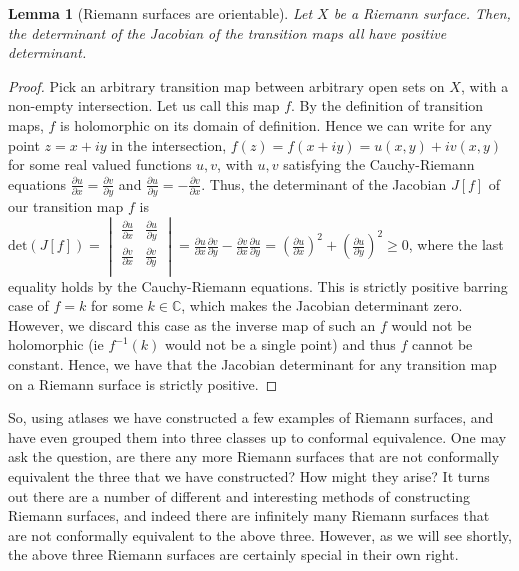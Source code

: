 \documentclass[11pt]{report}
\newtheorem{lemma}[thm]{Lemma}
\theoremstyle{definition}
\begin{document}
\begin{lemma}[Riemann surfaces are orientable]
  Let $X$ be a Riemann surface. Then, the determinant of the Jacobian of the transition maps all have positive determinant.
\end{lemma}
\begin{proof}
  Pick an arbitrary transition map between arbitrary open sets on $X$, with a non-empty intersection. Let us call this map $f$. By the definition of transition maps, $f$ is holomorphic on its domain of definition. Hence we can write for any point $z=x+iy$ in the intersection, $f(z) = f(x+iy)=u(x,y)+iv(x,y)$ for some real valued functions $u,v$, with $u,v$ satisfying the Cauchy-Riemann equations $\frac{\partial u}{\partial x} = \frac{\partial v}{\partial y}$ and $\frac{\partial u}{\partial y} = -\frac{\partial v}{\partial x}$. 
  Thus, the determinant of the Jacobian $J[f]$ of our transition map $f$ is 
  $\text{det}(J[f])=\begin{vmatrix}
    \frac{\partial u}{\partial x} & \frac{\partial u}{\partial y} \\
    \frac{\partial v}{\partial x} & \frac{\partial v}{\partial y} \\
  \end{vmatrix} = \frac{\partial u}{\partial x}\frac{\partial v}{\partial y} -  \frac{\partial v}{\partial x}\frac{\partial u}{\partial y}= (\frac{\partial u}{\partial x})^2 + (\frac{\partial u}{\partial y})^2 \geq 0$, where the last equality holds by the Cauchy-Riemann equations. This is strictly positive barring case of $f=k$ for some $k\in \mathbb{C}$, which makes the Jacobian determinant zero. However, we discard this case as the inverse map of such an $f$ would not be holomorphic (ie $f^{-1}(k)$ would not be a single point) and thus $f$ cannot be constant. Hence, we have that the Jacobian determinant for any transition map on a Riemann surface is strictly positive.
\end{proof}

So, using atlases we have constructed a few examples of Riemann surfaces, and have even grouped them into three classes up to conformal equivalence.
One may ask the question, are there any more Riemann surfaces that are not conformally equivalent the three that we have constructed? How might they arise? It turns out there are a number of different and interesting methods of constructing Riemann surfaces, and indeed there are infinitely many Riemann surfaces that are not conformally equivalent to the above three. However, as we will see shortly, the above three Riemann surfaces are certainly special in their own right.
\end{document}

